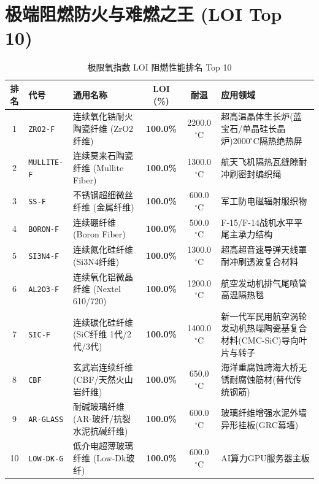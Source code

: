 \documentclass[11pt,openright,twoside,UTF8]{ctexbook}
\begin{document}
\section{极端阻燃防火与难燃之王 (LOI Top 10)}
\begin{table}[htbp]
\centering
\small
\caption{极限氧指数 LOI 阻燃性能排名 Top 10}
\begin{tabularx}{\textwidth}{cp{2.2cm}p{4.5cm}ccp{3.5cm}}
\toprule
\textbf{排名} & \textbf{代号} & \textbf{通用名称} & \textbf{LOI (\%)} & \textbf{耐温} & \textbf{应用领域} \\
\midrule
1 & \texttt{ZRO2-F} & 连续氧化锆耐火陶瓷纤维 (ZrO2纤维) & \textbf{100.0\%} & 2200.0 $^\circ\mathrm{C}$ & 超高温晶体生长炉(蓝宝石/单晶硅长晶炉)2000$^\circ\mathrm{C}$隔热绝热屏 \\ 
2 & \texttt{MULLITE-F} & 连续莫来石陶瓷纤维 (Mullite Fiber) & \textbf{100.0\%} & 1300.0 $^\circ\mathrm{C}$ & 航天飞机隔热瓦缝隙耐冲刷密封编织绳 \\ 
3 & \texttt{SS-F} & 不锈钢超细微丝纤维 (金属纤维) & \textbf{100.0\%} & 600.0 $^\circ\mathrm{C}$ & 军工防电磁辐射服织物 \\ 
4 & \texttt{BORON-F} & 连续硼纤维 (Boron Fiber) & \textbf{100.0\%} & 500.0 $^\circ\mathrm{C}$ & F-15/F-14战机水平平尾主承力结构 \\ 
5 & \texttt{SI3N4-F} & 连续氮化硅纤维 (Si3N4纤维) & \textbf{100.0\%} & 1300.0 $^\circ\mathrm{C}$ & 超高超音速导弹天线罩耐冲刷透波复合材料 \\ 
6 & \texttt{AL2O3-F} & 连续氧化铝微晶纤维 (Nextel 610/720) & \textbf{100.0\%} & 1200.0 $^\circ\mathrm{C}$ & 航空发动机排气尾喷管高温隔热毯 \\ 
7 & \texttt{SIC-F} & 连续碳化硅纤维 (SiC纤维 1代/2代/3代) & \textbf{100.0\%} & 1400.0 $^\circ\mathrm{C}$ & 新一代军民用航空涡轮发动机热端陶瓷基复合材料(CMC-SiC)导向叶片与转子 \\ 
8 & \texttt{CBF} & 玄武岩连续纤维 (CBF/天然火山岩纤维) & \textbf{100.0\%} & 650.0 $^\circ\mathrm{C}$ & 海洋重腐蚀跨海大桥无锈耐腐蚀筋材(替代传统钢筋) \\ 
9 & \texttt{AR-GLASS} & 耐碱玻璃纤维 (AR-玻纤/抗裂水泥抗碱纤维) & \textbf{100.0\%} & 600.0 $^\circ\mathrm{C}$ & 玻璃纤维增强水泥外墙异形挂板(GRC幕墙) \\ 
10 & \texttt{LOW-DK-G} & 低介电超薄玻璃纤维 (Low-Dk玻纤) & \textbf{100.0\%} & 600.0 $^\circ\mathrm{C}$ & AI算力GPU服务器主板 \\ 
\bottomrule
\end{tabularx}
\end{table}
\end{document}
